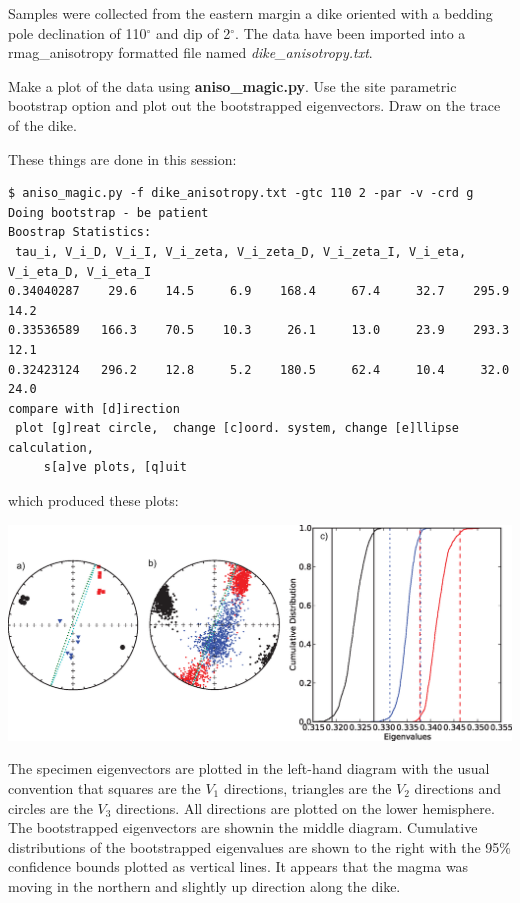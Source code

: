 \documentclass[11pt]{book}
\begin{document}
{Samples were collected from the eastern margin a dike  oriented  with a bedding pole declination of 110$^{\circ}$ and dip of 2$^{\circ}$.      The data have been imported into a rmag\_anisotropy formatted file named {\it dike\_anisotropy.txt}.

Make a plot of the data using {\bf aniso\_magic.py}.  Use the site parametric bootstrap option and plot out the bootstrapped eigenvectors.   Draw on the trace of the dike.

These things  are done in this session:

\begin{verbatim}
$ aniso_magic.py -f dike_anisotropy.txt -gtc 110 2 -par -v -crd g
Doing bootstrap - be patient
Boostrap Statistics:
 tau_i, V_i_D, V_i_I, V_i_zeta, V_i_zeta_D, V_i_zeta_I, V_i_eta, V_i_eta_D, V_i_eta_I
0.34040287    29.6    14.5     6.9    168.4     67.4     32.7    295.9     14.2
0.33536589   166.3    70.5    10.3     26.1     13.0     23.9    293.3     12.1
0.32423124   296.2    12.8     5.2    180.5     62.4     10.4     32.0     24.0
compare with [d]irection
 plot [g]reat circle,  change [c]oord. system, change [e]llipse calculation,
     s[a]ve plots, [q]uit

\end{verbatim}

{\noindent which produced these plots:}


  \includegraphics[width=15cm]{EPSfiles/dike.eps}

The specimen eigenvectors are plotted in the left-hand diagram with the usual convention that squares are the $V_1$ directions, triangles are the $V_2$ directions and circles are the $V_3$ directions.  All directions are plotted on the lower hemisphere.     The bootstrapped eigenvectors are shownin the middle diagram.   Cumulative distributions of the bootstrapped eigenvalues are shown to the right with the 95\% confidence bounds plotted as vertical lines.
It appears that the magma was moving in the northern and slightly up direction along the dike.

}
\end{document}
